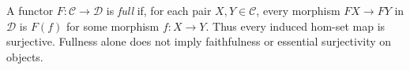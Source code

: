 
A functor $F:\mathcal C\to\mathcal D$ is \emph{full} if, for each pair $X,Y\in\mathcal C$, every morphism $F X\to F Y$ in $\mathcal D$ is $F(f)$ for some morphism $f:X\to Y$. Thus every induced hom-set map is surjective. Fullness alone does not imply faithfulness or essential surjectivity on objects.
